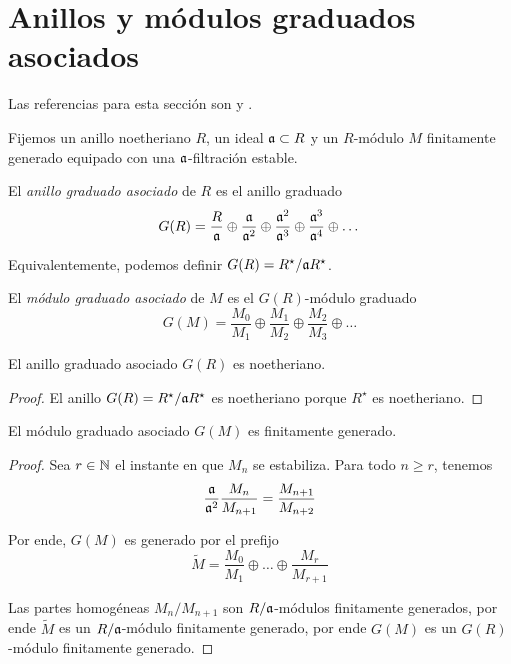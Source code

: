 \section{Anillos y módulos graduados asociados}

\noindent Las referencias para esta sección son \cite[pp. 111-112]{atiyah} y \cite[pp. 146-148]{eisenbud}.

\begin{preliminaries}
Fijemos un anillo noetheriano $R$, un ideal $\mathfrak a \subset R$ y un $R$-módulo $M$ finitamente generado equipado con una $\mathfrak a$-filtración estable.
\end{preliminaries}

\begin{definition}
El \textit{anillo graduado asociado} de $R$ es el anillo graduado
$$G(R) = \dfrac R {\mathfrak a} \oplus \dfrac {\mathfrak a} {\mathfrak a^2} \oplus \dfrac {\mathfrak a^2} {\mathfrak a^3} \oplus \dfrac {\mathfrak a^3} {\mathfrak a^4} \oplus \dots$$
\end{definition}

\begin{remark}
Equivalentemente, podemos definir $G(R) = R^\star / \mathfrak a R^\star$.
\end{remark}

\begin{definition}
El \textit{módulo graduado asociado} de $M$ es el $G(R)$-módulo graduado
$$G(M) = \dfrac {M_0} {M_1} \oplus \dfrac {M_1} {M_2} \oplus \dfrac {M_2} {M_3} \oplus \dots$$
\end{definition}

\begin{proposition}
El anillo graduado asociado $G(R)$ es noetheriano.
\end{proposition}

\begin{proof}
El anillo $G(R) = R^\star / \mathfrak a R^\star$ es noetheriano porque $R^\star$ es noetheriano.
\end{proof}

\begin{proposition}
El módulo graduado asociado $G(M)$ es finitamente generado.
\end{proposition}

\begin{proof}
Sea $r \in \mathbb N$ el instante en que $M_n$ se estabiliza. Para todo $n \ge r$, tenemos
$$\dfrac {\mathfrak a} {\mathfrak a^2} \dfrac {M_n} {M_{n+1}} = \dfrac {M_{n+1}} {M_{n+2}}$$

Por ende, $G(M)$ es generado por el prefijo
$$\tilde M = \dfrac {M_0} {M_1} \oplus \dots \oplus \dfrac {M_r} {M_{r+1}}$$

Las partes homogéneas $M_n / M_{n+1}$ son $R/\mathfrak a$-módulos finitamente generados, por ende $\tilde M$ es un $R/\mathfrak a$-módulo finitamente generado, por ende $G(M)$ es un $G(R)$-módulo finitamente generado.
\end{proof}
